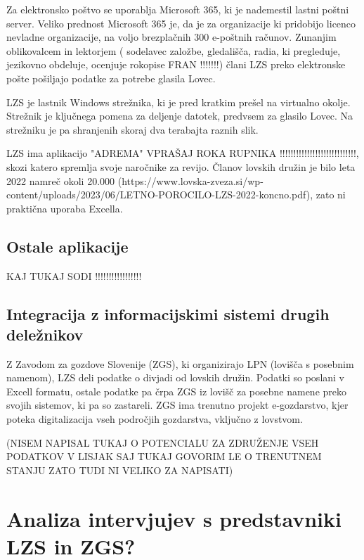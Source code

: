 \documentclass[a4paper,12pt,openright]{book}
\begin{document}
Za elektronsko poštvo se uporablja Microsoft 365, ki je nademestil lastni poštni server.
Veliko prednost Microsoft 365 je, da je za organizacije ki pridobijo licenco nevladne organizacije, na voljo brezplačnih 300 e-poštnih računov.
Zunanjim oblikovalcem in lektorjem ( sodelavec založbe, gledališča, radia, ki pregleduje, jezikovno obdeluje, ocenjuje rokopise FRAN !!!!!!!) člani LZS preko elektronske pošte pošiljajo podatke za potrebe glasila Lovec.

LZS je lastnik Windows strežnika, ki je pred kratkim prešel na virtualno okolje.
Strežnik je ključnega pomena za deljenje datotek, predvsem za glasilo Lovec.
Na strežniku je pa shranjenih skoraj dva terabajta raznih slik.

LZS ima aplikacijo "ADREMA" VPRAŠAJ ROKA RUPNIKA !!!!!!!!!!!!!!!!!!!!!!!!!!!!, skozi katero spremlja svoje naročnike za revijo. 
Članov lovskih družin je bilo leta 2022 namreč okoli 20.000 (https://www.lovska-zveza.si/wp-content/uploads/2023/06/LETNO-POROCILO-LZS-2022-koncno.pdf), zato ni praktična uporaba Excella.



\section{Ostale aplikacije}

KAJ TUKAJ SODI !!!!!!!!!!!!!!!!!

\section{Integracija z informacijskimi sistemi drugih deležnikov}

Z Zavodom za gozdove Slovenije (ZGS), ki organizirajo LPN (lovišča s posebnim namenom), LZS deli podatke o divjadi od lovskih družin.
Podatki so poslani v Excell formatu, ostale podatke pa črpa ZGS iz lovišč za posebne namene preko svojih sistemov, ki pa so zastareli.
ZGS ima trenutno projekt e-gozdarstvo, kjer poteka digitalizacija vseh področjih gozdarstva, vključno z lovstvom.

(NISEM NAPISAL TUKAJ O POTENCIALU ZA ZDRUŽENJE VSEH PODATKOV V LISJAK SAJ TUKAJ GOVORIM LE O TRENUTNEM STANJU ZATO TUDI NI VELIKO ZA NAPISATI)

\chapter{Analiza intervjujev s predstavniki LZS in ZGS?}
\label{ch2}
\end{document}
